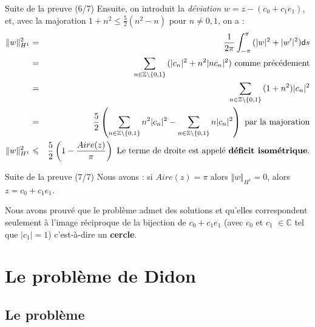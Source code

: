 \documentclass[11pt,envcountsect,aspectratio=169]{beamer} %
\newcommand{\Z}{\mathbb{Z}}
\renewcommand{\d}{\mathsf{d}}
\renewcommand{\ss}{\vspace*{\baselineskip}}
\begin{document}
\begin{frame}{Suite de la preuve (6/7)}
    Ensuite, on introduit la \emph{déviation} $w=z-(c_0+c_1e_1)$, et, avec la majoration $1+n^2\leqslant \frac{5}{2}(n^2-n)$ pour $n\neq 0,1$, on a :
    \begin{eqnarray*}
    \Vert w\Vert_{H^1}^2 &=& \frac{1}{2\pi} \int_{-\pi}^{\pi}{ (|w|^2+|w'|^2)\d s} \\
    &=& \sum_{n\in \Z\backslash \{0,1\}}{(|c_n|^2+ n^2|nc_n|^2)} \text{ comme précédement} \\
    &=& \sum_{n\in \Z\backslash \{0,1\}}{(1+n^2) |c_n|^2 } \\
    &=& \frac{5}{2} \left( \sum_{n\in \Z\backslash \{0,1\}}{n^2|c_n|^2} - \sum_{n\in \Z\backslash \{0,1\}}{n|c_n|^2} \right) \text{ par la majoration} \\
    \Vert w\Vert_{H^1}^2 &\leqslant& \frac{5}{2} \left(1-\frac{Aire(z)}{\pi}\right) \text{ Le terme de droite est appelé \textbf{déficit isométrique}.}
    \end{eqnarray*}
    
\end{frame}

\begin{frame}{Suite de la preuve (7/7)}
    Nous avons : si $Aire(z)=\pi$ alors $\Vert w \Vert_{H^1} = 0$, alors $z=c_0+c_1e_1$.
    \ss
    
    Nous avons prouvé que le problème admet des solutions et qu'elles correspondent seulement à l'image réciproque de la bijection de $c_0+c_1e_1$ (avec $c_0$ et $c_1$ $\in \mathbb{C}$ tel que $|c_1|=1$) c'est-à-dire un \textbf{cercle}.
\end{frame}










\section{Le problème de Didon}


\subsection{Le problème}
\end{document}
